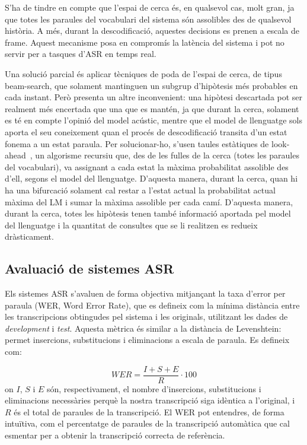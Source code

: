 S'ha de tindre en compte que l'espai de cerca és, en qualsevol cas, molt gran, ja que totes les paraules del vocabulari del sistema són assolibles des de qualsevol història. A més, durant la descodificació, aquestes decisions es prenen a escala de frame. Aquest mecanisme posa en compromís la latència del sistema i pot no servir per a tasques d'ASR en temps real.

Una solució parcial és aplicar tècniques de poda de l'espai de cerca, de tipus beam-search, que solament mantinguen un subgrup d'hipòtesis més probables en cada instant. Però presenta un altre inconvenient: una hipòtesi descartada pot ser realment més encertada que una que es mantén, ja que durant la cerca, solament es té en compte l'opinió del model acústic, mentre que el model de llenguatge sols aporta el seu coneixement quan el procés de descodificació transita d'un estat fonema a un estat paraula.
Per solucionar-ho, s'usen taules estàtiques de look-ahead~\cite{jorge19_interspeech}, un algorisme recursiu que, des de les fulles de la cerca (totes les paraules del vocabulari), va assignant a cada estat la màxima probabilitat assolible des d'ell, segons el model del llenguatge. D'aquesta manera, durant la cerca, quan hi ha una bifurcació solament cal restar a l'estat actual la probabilitat actual màxima del LM i sumar la màxima assolible per cada camí. 
D'aquesta manera, durant la cerca, totes les hipòtesis tenen també informació aportada pel model del llenguatge i la quantitat de consultes que se li realitzen es redueix dràsticament.

\subsection{Avaluació de sistemes ASR}
\label{cap02_asr_avaluacio}

Els sistemes ASR s'avaluen de forma objectiva mitjançant la taxa d'error per paraula (WER, Word Error Rate), que es defineix com la mínima distància entre les transcripcions obtingudes pel sistema i les originals, utilitzant les dades de \textit{development} i \textit{test}.
Aquesta mètrica és similar a la distància de Levenshtein: permet insercions, substitucions i eliminacions a escala de paraula. Es defineix com:

\begin{equation}
WER = \frac{I + S + E}{R}\cdot 100
\end{equation}
on $I$, $S$ i $E$ són, respectivament, el nombre d'insercions, substitucions i eliminacions necessàries perquè la nostra transcripció siga idèntica a l'original, i $R$ és el total de paraules de la transcripció.
El WER pot entendres, de forma intuïtiva, com el percentatge de paraules de la transcripció automàtica que cal esmentar per a obtenir la transcripció correcta de referència.

